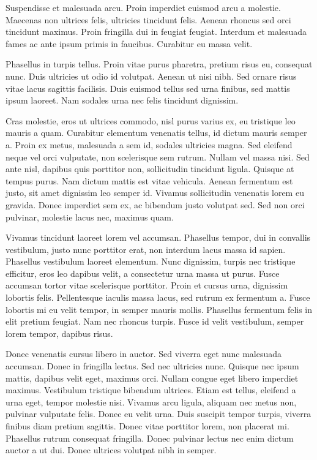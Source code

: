 \documentclass[12pt, a4paper]{article}
\begin{document}
Suspendisse et malesuada arcu. Proin imperdiet euismod arcu a molestie. Maecenas non ultrices felis, ultricies tincidunt felis. Aenean rhoncus sed orci tincidunt maximus. Proin fringilla dui in feugiat feugiat. Interdum et malesuada fames ac ante ipsum primis in faucibus. Curabitur eu massa velit.

Phasellus in turpis tellus. Proin vitae purus pharetra, pretium risus eu, consequat nunc. Duis ultricies ut odio id volutpat. Aenean ut nisi nibh. Sed ornare risus vitae lacus sagittis facilisis. Duis euismod tellus sed urna finibus, sed mattis ipsum laoreet. Nam sodales urna nec felis tincidunt dignissim.

Cras molestie, eros ut ultrices commodo, nisl purus varius ex, eu tristique leo mauris a quam. Curabitur elementum venenatis tellus, id dictum mauris semper a. Proin ex metus, malesuada a sem id, sodales ultricies magna. Sed eleifend neque vel orci vulputate, non scelerisque sem rutrum. Nullam vel massa nisi. Sed ante nisl, dapibus quis porttitor non, sollicitudin tincidunt ligula. Quisque at tempus purus. Nam dictum mattis est vitae vehicula. Aenean fermentum est justo, sit amet dignissim leo semper id. Vivamus sollicitudin venenatis lorem eu gravida. Donec imperdiet sem ex, ac bibendum justo volutpat sed. Sed non orci pulvinar, molestie lacus nec, maximus quam.

Vivamus tincidunt laoreet lorem vel accumsan. Phasellus tempor, dui in convallis vestibulum, justo nunc porttitor erat, non interdum lacus massa id sapien. Phasellus vestibulum laoreet elementum. Nunc dignissim, turpis nec tristique efficitur, eros leo dapibus velit, a consectetur urna massa ut purus. Fusce accumsan tortor vitae scelerisque porttitor. Proin et cursus urna, dignissim lobortis felis. Pellentesque iaculis massa lacus, sed rutrum ex fermentum a. Fusce lobortis mi eu velit tempor, in semper mauris mollis. Phasellus fermentum felis in elit pretium feugiat. Nam nec rhoncus turpis. Fusce id velit vestibulum, semper lorem tempor, dapibus risus.

Donec venenatis cursus libero in auctor. Sed viverra eget nunc malesuada accumsan. Donec in fringilla lectus. Sed nec ultricies nunc. Quisque nec ipsum mattis, dapibus velit eget, maximus orci. Nullam congue eget libero imperdiet maximus. Vestibulum tristique bibendum ultrices. Etiam est tellus, eleifend a urna eget, tempor molestie nisi. Vivamus arcu ligula, aliquam nec metus non, pulvinar vulputate felis. Donec eu velit urna. Duis suscipit tempor turpis, viverra finibus diam pretium sagittis. Donec vitae porttitor lorem, non placerat mi. Phasellus rutrum consequat fringilla. Donec pulvinar lectus nec enim dictum auctor a ut dui. Donec ultrices volutpat nibh in semper.
\end{document}
